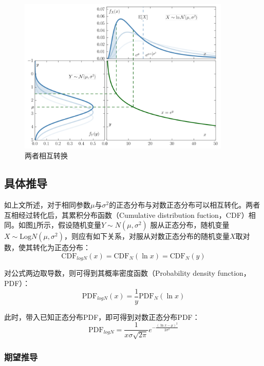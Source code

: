 \documentclass[11pt]{article}
\begin{document}
\begin{figure}[ht!]
    \centering
    \includegraphics[width=0.9\textwidth]{fig/lognormal-distribution.png}
    \caption{两者相互转换}
    \label{fig:lognormal}
\end{figure}

\subsection{具体推导}

如上文所述，对于相同参数$\mu$与$\sigma^2$的正态分布与对数正态分布可以相互转化。两者互相经过转化后，其累积分布函数（Cumulative distribution fuction，CDF）相同。如图\ref{fig:lognormal}所示，假设随机变量$Y \sim N(\mu,\sigma^2)$ 服从正态分布，随机变量$X \sim \text{Log}N(\mu,\sigma^2)$，则应有如下关系，对服从对数正态分布的随机变量$X$取对数，使其转化为正态分布：
\begin{equation*}
    \text{CDF}_{logN}(x) = \text{CDF}_N (\ln x) = \text{CDF}_N (y)
\end{equation*}

对公式两边取导数，则可得到其概率密度函数（Probability density function，PDF）：
\begin{equation*}
    \text{PDF}_{logN}(x) = \frac{1}{y} \text{PDF}_N(\ln x)
\end{equation*}

此时，带入已知正态分布PDF，即可得到对数正态分布PDF：
\begin{equation*}
    \text{PDF}_{logN} = \frac{1}{x\sigma\sqrt{2\pi}} e^{-\frac{(\ln x - \mu)^2}{2\sigma^2}}
\end{equation*}

\subsubsection{期望推导}
\end{document}
